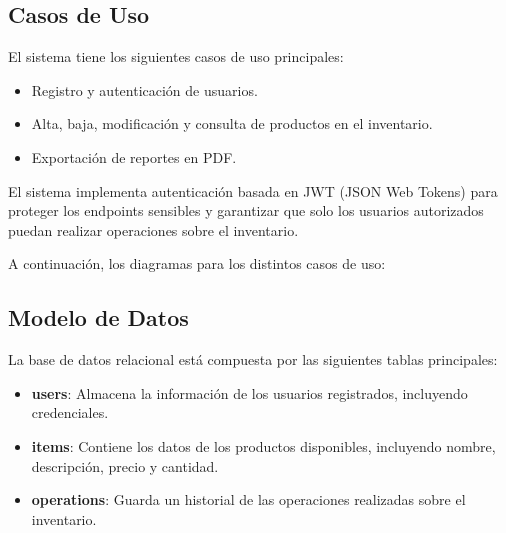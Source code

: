 
\subsection{Casos de Uso}

El sistema tiene los siguientes casos de uso principales:

\begin{itemize}
    \item Registro y autenticación de usuarios.
    \item Alta, baja, modificación y consulta de productos en el inventario.
    \item Exportación de reportes en PDF.
\end{itemize}

El sistema implementa autenticación basada en JWT (JSON Web Tokens) para proteger los endpoints sensibles y garantizar que solo los usuarios autorizados puedan realizar operaciones sobre el inventario.

A continuación, los diagramas para los distintos casos de uso:


\subsection{Modelo de Datos}

La base de datos relacional está compuesta por las siguientes tablas principales:

\begin{itemize}
    \item \textbf{users}: Almacena la información de los usuarios registrados, incluyendo credenciales.
    \item \textbf{items}: Contiene los datos de los productos disponibles, incluyendo nombre, descripción, precio y cantidad.
    \item \textbf{operations}: Guarda un historial de las operaciones realizadas sobre el inventario.
\end{itemize}

